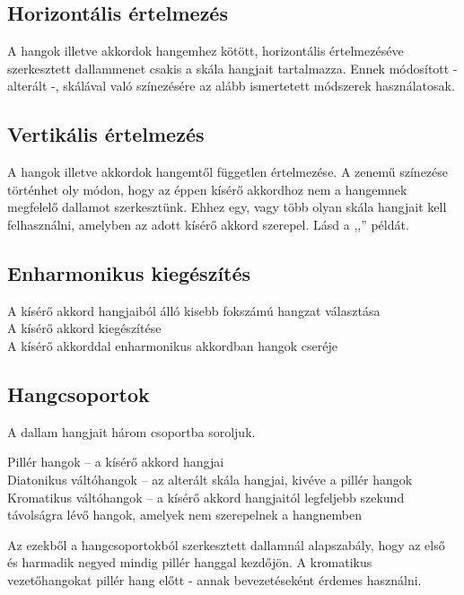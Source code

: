 \subsection{Horizontális értelmezés}
\label{sec:horizontalisertelmezes}
A hangok illetve akkordok hangemhez kötött, horizontális értelmezéséve szerkesztett dallammenet csakis a skála hangjait tartalmazza. Ennek módosított - alterált -, skálával való színezésére az alább ismertetett módszerek használatosak.
\subsection{Vertikális értelmezés}
\label{sec:vertikalisertelmezes}
A hangok illetve akkordok hangemtől független értelmezése. A zenemű színezése történhet oly módon, hogy az éppen kísérő akkordhoz nem a hangemnek megfelelő dallamot szerkesztünk. Ehhez egy, vagy több olyan skála hangjait kell felhasználni, amelyben az adott kísérő akkord szerepel. Lásd a ,,'' példát.
\subsection{Enharmonikus kiegészítés}
\label{sec:enhkiegeszites}
\begin{pitemize}
A kísérő akkord hangjaiból álló kisebb fokszámú hangzat választása \\
A kísérő akkord kiegészítése \\
A kísérő akkorddal enharmonikus akkordban hangok cseréje \\
\end{pitemize}
\subsection{Hangcsoportok}
A dallam hangjait három csoportba soroljuk.
\begin{pitemize}
Pillér hangok -- a kísérő akkord hangjai \\
Diatonikus váltóhangok -- az alterált skála hangjai, kivéve a pillér hangok \\
Kromatikus váltóhangok -- a kísérő akkord hangjaitól legfeljebb szekund távolságra lévő hangok, amelyek nem szerepelnek a hangnemben \\
\end{pitemize}
Az ezekből a hangcsoportokból szerkesztett dallamnál alapszabály, hogy az első és harmadik negyed mindig pillér hanggal kezdőjön. A kromatikus vezetőhangokat pillér hang előtt - annak bevezetéseként érdemes használni.

